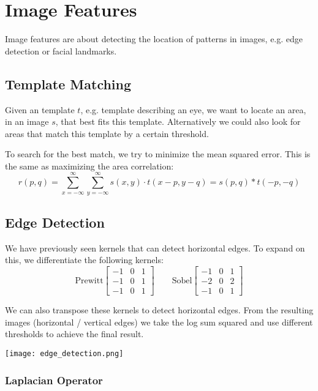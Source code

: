 \section{Image Features}

Image features are about detecting the location of patterns in images, e.g. edge detection or facial landmarks.


\subsection{Template Matching}

Given an template $t$, e.g. template describing an eye, we want to locate an area, in an image $s$, that best fits this template. Alternatively we could also look for areas that match this template by a certain threshold. \medskip

To search for the best match, we try to minimize the mean squared error. This is the same as maximizing the area correlation:
$$r(p, q) = \sum_{x = -\infty}^\infty \sum_{y = -\infty}^\infty s(x,y) \cdot t(x - p, y - q) = s(p,q) * t(-p, -q)$$


\subsection{Edge Detection}

We have previously seen kernels that can detect horizontal edges. To expand on this, we differentiate the following kernels:
$$ \text{Prewitt} 
\begin{bmatrix}
    -1 & 0 & 1\\
    -1 & 0 & 1\\
    -1 & 0 & 1
\end{bmatrix}
\qquad
\text{Sobel} 
\begin{bmatrix}
    -1 & 0 & 1\\
    -2 & 0 & 2\\
    -1 & 0 & 1
\end{bmatrix}
$$

We can also transpose these kernels to detect horizontal edges. From the resulting images (horizontal / vertical edges) we take the log sum squared and use different thresholds to achieve the final result.
\begin{center}
	\texttt{[image: edge\_detection.png]}
\end{center}

\subsubsection{Laplacian Operator}

